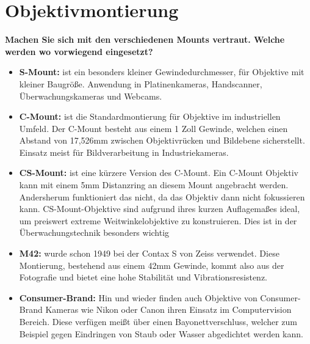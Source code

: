 \documentclass[a4paper]{article}
\begin{document}
	\section{Objektivmontierung}
	\textbf{Machen Sie sich mit den verschiedenen Mounts vertraut. Welche werden wo vorwiegend
		eingesetzt?}\\
	\begin{itemize}
		\item \textbf{S-Mount:} ist ein besonders kleiner Gewindedurchmesser, für Objektive mit kleiner Baugröße. Anwendung in Platinenkameras, Handscanner, Überwachungskameras und Webcams.\\
		\item \textbf{C-Mount:} ist die Standardmontierung für Objektive im industriellen Umfeld. Der C-Mount besteht aus einem 1 Zoll Gewinde, welchen einen Abstand von 17,526mm zwischen Objektivrücken und Bildebene sicherstellt. Einsatz meist für Bildverarbeitung in Industriekameras.\\
		\item \textbf{CS-Mount:} ist eine kürzere Version des C-Mount. Ein C-Mount Objektiv kann mit einem 5mm Distanzring an diesem Mount angebracht werden. Andersherum funktioniert das nicht, da das Objektiv dann nicht fokussieren kann. CS-Mount-Objektive sind aufgrund ihres kurzen Auflagemaßes ideal, um preiswert extreme Weitwinkelobjektive zu konstruieren. Dies ist in der Überwachungstechnik besonders wichtig\\
		\item \textbf{M42:} wurde schon 1949 bei der Contax S von Zeiss verwendet. Diese Montierung, bestehend aus einem 42mm Gewinde, kommt also aus der Fotografie und bietet eine hohe Stabilität und Vibrationsresistenz.\\
		\item \textbf{Consumer-Brand:} Hin und wieder finden auch Objektive von Consumer-Brand Kameras wie Nikon oder Canon ihren Einsatz im Computervision Bereich. Diese verfügen meißt über einen Bayonettverschluss, welcher zum Beispiel gegen Eindringen von Staub oder Wasser abgedichtet werden kann.\\
	\end{itemize}
	
\end{document}
